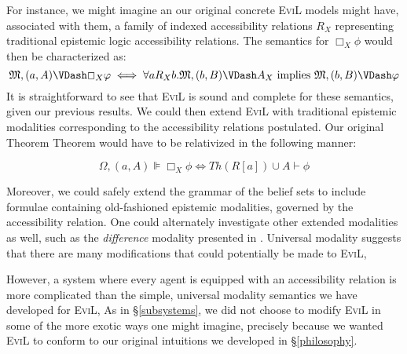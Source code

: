 For instance, we might imagine an our original concrete \textsc{EviL} models might
have, associated with them, a family of indexed accessibility
relations $R_X$ representing traditional epistemic logic 
 accessibility relations.
The semantics for $\Box_X \phi$ would then be characterized as:
\[ \Omega, (a,A) \VDash \Box_X \phi \iff \forall a R_X
b. \Omega,(b,B) \VDash A_X \textup{ implies } \Omega,(b,B) \VDash
\phi \]
It is straightforward to see that \textsc{EviL} is sound and complete
for these semantics, given our previous results.  We could then extend
\textsc{EviL} with traditional epistemic modalities corresponding to
the accessibility relations postulated.  Our original Theorem Theorem
would have to be relativized in the following manner:

\[ \Omega, (a,A) \VDash \Box_X \phi \iff Th(R[a]) \cup A \vdash \phi \]

Moreover, we could safely extend the grammar of the belief sets to include
formulae containing old-fashioned epistemic modalities, governed by
the accessibility relation. One could alternately investigate other extended
modalities as well, such as the \emph{difference} modality presented
in \cite[chapter 7.4]{van_benthem_modal_2010}.  Universal modality suggests that there
are many modifications that could potentially be made to \textsc{EviL}, 

However, a system where every agent is equipped with an accessibility
relation is more complicated than the simple, universal
modality semantics we have developed for \textsc{EviL}, 
As in \S\ref{subsystems}, we did not choose to modify
\textsc{EviL} in some of the more exotic ways one might imagine,
precisely because we wanted \textsc{EviL} to conform to our original
intuitions we developed in \S\ref{philosophy}.

